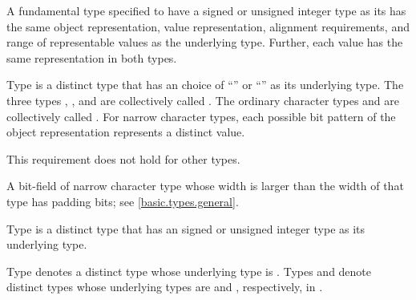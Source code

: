 \pnum
A fundamental type specified to have
a signed or unsigned integer type as its  has
the same object representation,
value representation,
alignment requirements, and
range of representable values as the underlying type.
Further, each value has the same representation in both types.

\pnum
{}%
%
%
%
%
%
Type  is a distinct type
that has an  choice of
``'' or ``'' as its underlying type.
The three types , , and 
are collectively called
.
The ordinary character types and 
are collectively called .
For narrow character types,
each possible bit pattern of the object representation represents
a distinct value.
\begin{note}
This requirement does not hold for other types.
\end{note}
\begin{note}
A bit-field of narrow character type whose width is larger than
the width of that type has padding bits; see \ref{basic.types.general}.
\end{note}

\pnum
{}%
%
%
Type  is a distinct type that has
an 
signed or unsigned integer type as its underlying type.

\pnum
{}%
%
%
Type  denotes a distinct type
whose underlying type is .
%
%
%
%
%
%
Types  and  denote distinct types
whose underlying types are  and ,
respectively, in .


